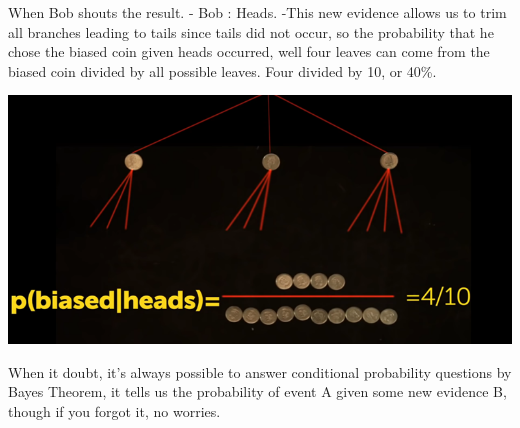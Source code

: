 \documentclass{report}
\begin{document}
 When Bob shouts the result. - Bob : Heads. -This new evidence allows us to trim all branches leading to tails since tails did not occur, so the probability that he chose the biased coin given heads occurred, well four leaves can come from the biased coin divided by all possible leaves. Four divided by 10, or 40\%. 
 \begin{center}
	\includegraphics[scale=1]{80.png}
\end{center}

When it doubt, it's always possible to answer conditional probability questions by Bayes Theorem, it tells us the probability of event A given some new evidence B, though if you forgot it, no worries.
\end{document}
